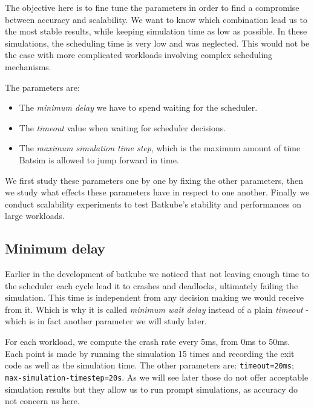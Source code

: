 The objective here is to fine tune the parameters in order to find a compromise
between accuracy and scalability. We want to know which combination lead us to
the most stable results, while keeping simulation time as low as possible. In
these simulations, the scheduling time is very low and was neglected.  This
would not be the case with more complicated workloads involving complex
scheduling mechanisms.

The parameters are:
\begin{itemize}
	\item The \textit{minimum delay} we have to spend waiting for the
		scheduler.
	\item The \textit{timeout} value when waiting for scheduler decisions.
	\item The \textit{maximum simulation time step}, which is the maximum
		amount of time Batsim is allowed to jump forward in time.
\end{itemize}

We first study these parameters one by one by fixing the other parameters, then we study what effects these parameters have in respect
to one another. Finally we conduct scalability experiments to test
Batkube's stability and performances on large workloads.

\subsection{Minimum delay}

Earlier in the development of batkube we noticed that not leaving enough time
to the scheduler each cycle lead it to crashes and deadlocks, ultimately
failing the simulation. This time is independent from any decision making we
would receive from it. Which is why it is called \textit{minimum wait delay}
instead of a plain \textit{timeout} - which is in fact another parameter we
will study later.

For each workload, we compute the crash rate every 5ms, from 0ms to 50ms. Each
point is made by running the simulation 15 times and recording the exit code as
well as the simulation time. The other parameters are: \texttt{timeout=20ms};
\texttt{max-simulation-timestep=20s}. As we will see later those do not offer
acceptable simulation results but they allow us to run prompt simulations, as
accuracy do not concern us here.\\

